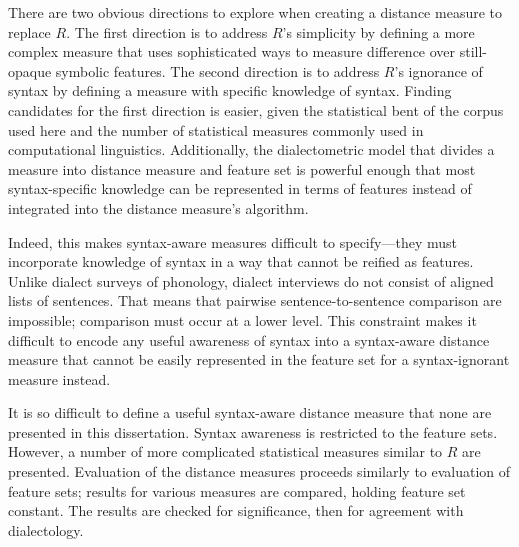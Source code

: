 

There are two obvious directions to explore when creating a distance
measure to replace $R$. The first direction is to address $R$'s
simplicity by defining a more complex measure that uses sophisticated
ways to measure difference over still-opaque symbolic features. The
second direction is to address $R$'s ignorance of syntax by defining a
measure with specific knowledge of syntax. Finding candidates for the
first direction is easier, given the statistical bent of the corpus
used here and the number of statistical measures commonly used in
computational linguistics. Additionally, the dialectometric model that
divides a measure into distance measure and feature set is powerful
enough that most syntax-specific knowledge can be represented in terms
of features instead of integrated into the distance measure's
algorithm.

Indeed, this makes syntax-aware measures difficult to
specify---they must incorporate knowledge of syntax in a way that
cannot be reified as features. Unlike dialect surveys of phonology,
dialect interviews do not consist of aligned lists of sentences. That
means that pairwise sentence-to-sentence comparison are impossible;
comparison must occur at a lower level. This constraint makes it
difficult to encode any useful awareness of syntax into a syntax-aware
distance measure that cannot be easily represented in the feature set
for a syntax-ignorant measure instead.

It is so difficult to define a useful syntax-aware distance measure
that none are presented in this dissertation. Syntax awareness is
restricted to the feature sets. However, a number of more complicated
statistical measures similar to $R$ are presented. Evaluation of the
distance measures proceeds similarly to evaluation of feature sets;
results for various measures are compared, holding feature set
constant. The results are checked for significance, then for agreement
with dialectology.

